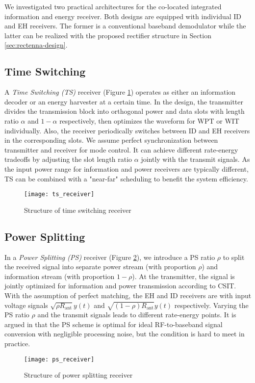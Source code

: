We investigated two practical architectures for the co-located integrated information and energy receiver. Both designs are equipped with individual ID and EH receivers. The former is a conventional baseband demodulator while the latter can be realized with the proposed rectifier structure in Section \ref{sec:rectenna-design}.



\subsection{Time Switching}\label{sec:time-switching}
A \textit{Time Switching (TS)} receiver (Figure \ref{fig:ts-receiver}) operates as either an information decoder or an energy harvester at a certain time. In the design, the transmitter divides the transmission block into orthogonal power and data slots with length ratio $\alpha $ and $1 - \alpha $ respectively, then optimizes the waveform for WPT or WIT individually. Also, the receiver periodically switches between ID and EH receivers in the corresponding slots. We assume perfect synchronization between transmitter and receiver for mode control. It can achieve different rate-energy tradeoffs by adjusting the slot length ratio $\alpha $ jointly with the transmit signals. As the input power range for information and power receivers are typically different, TS can be combined with a "near-far" scheduling \cite{Zhang2013} to benefit the system efficiency.

\begin{figure}
  \centering
    \texttt{[image: ts\_receiver]}
  \caption{Structure of time switching receiver \cite{Clerckx2019}}
  \label{fig:ts-receiver}
\end{figure}



\subsection{Power Splitting}\label{sec:power-splitting}
In a \textit{Power Splitting (PS)} receiver (Figure \ref{fig:ps-receiver}), we introduce a PS ratio $\rho $ to split the received signal into separate power stream (with proportion $\rho $) and information stream (with proportion $1 - \rho $). At the transmitter, the signal is jointly optimized for information and power transmission according to CSIT. With the assumption of perfect matching, the EH and ID receivers are with input voltage signals $\sqrt {\rho {R_{{\text{ant}}}}} y(t)$ and $\sqrt {(1 - \rho ){R_{{\text{ant}}}}} y(t)$ respectively. Varying the PS ratio $\rho $ and the transmit signals leads to different rate-energy points. It is argued in \cite{Zhang2013} that the PS scheme is optimal for ideal RF-to-baseband signal conversion with negligible processing noise, but the condition is hard to meet in practice.

\begin{figure}
  \centering
    \texttt{[image: ps\_receiver]}
  \caption{Structure of power splitting receiver \cite{Clerckx2019}}
  \label{fig:ps-receiver}
\end{figure} 